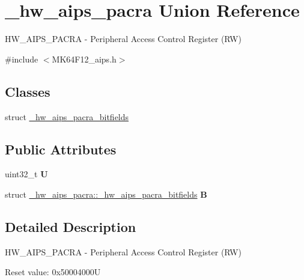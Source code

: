 \hypertarget{union__hw__aips__pacra}{}\section{\+\_\+hw\+\_\+aips\+\_\+pacra Union Reference}
\label{union__hw__aips__pacra}


H\+W\+\_\+\+A\+I\+P\+S\+\_\+\+P\+A\+C\+RA -\/ Peripheral Access Control Register (RW)  




{\ttfamily \#include $<$M\+K64\+F12\+\_\+aips.\+h$>$}

\subsection*{Classes}
\begin{DoxyCompactItemize}
\item 
struct \hyperlink{struct__hw__aips__pacra_1_1__hw__aips__pacra__bitfields}{\+\_\+hw\+\_\+aips\+\_\+pacra\+\_\+bitfields}
\end{DoxyCompactItemize}
\subsection*{Public Attributes}
\begin{DoxyCompactItemize}
\item 
uint32\+\_\+t {\bfseries U}\hypertarget{union__hw__aips__pacra_a285208d39ae81449961145e354df7693}{}\label{union__hw__aips__pacra_a285208d39ae81449961145e354df7693}

\item 
struct \hyperlink{struct__hw__aips__pacra_1_1__hw__aips__pacra__bitfields}{\+\_\+hw\+\_\+aips\+\_\+pacra\+::\+\_\+hw\+\_\+aips\+\_\+pacra\+\_\+bitfields} {\bfseries B}\hypertarget{union__hw__aips__pacra_ab2ccd62c21a9dfad2b8044a819a9d33b}{}\label{union__hw__aips__pacra_ab2ccd62c21a9dfad2b8044a819a9d33b}

\end{DoxyCompactItemize}


\subsection{Detailed Description}
H\+W\+\_\+\+A\+I\+P\+S\+\_\+\+P\+A\+C\+RA -\/ Peripheral Access Control Register (RW) 

Reset value\+: 0x50004000U


